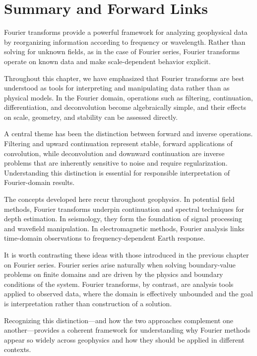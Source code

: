 \section{Summary and Forward Links}

Fourier transforms provide a powerful framework for analyzing geophysical data by reorganizing information according to frequency or wavelength. Rather than solving for unknown fields, as in the case of Fourier series, Fourier transforms operate on known data and make scale-dependent behavior explicit.

Throughout this chapter, we have emphasized that Fourier transforms are best understood as tools for interpreting and manipulating data rather than as physical models. In the Fourier domain, operations such as filtering, continuation, differentiation, and deconvolution become algebraically simple, and their effects on scale, geometry, and stability can be assessed directly.

A central theme has been the distinction between forward and inverse operations. Filtering and upward continuation represent stable, forward applications of convolution, while deconvolution and downward continuation are inverse problems that are inherently sensitive to noise and require regularization. Understanding this distinction is essential for responsible interpretation of Fourier-domain results.

The concepts developed here recur throughout geophysics. In potential field methods, Fourier transforms underpin continuation and spectral techniques for depth estimation. In seismology, they form the foundation of signal processing and wavefield manipulation. In electromagnetic methods, Fourier analysis links time-domain observations to frequency-dependent Earth response.

It is worth contrasting these ideas with those introduced in the previous chapter on Fourier series. Fourier series arise naturally when solving boundary-value problems on finite domains and are driven by the physics and boundary conditions of the system. Fourier transforms, by contrast, are analysis tools applied to observed data, where the domain is effectively unbounded and the goal is interpretation rather than construction of a solution.

Recognizing this distinction—and how the two approaches complement one another—provides a coherent framework for understanding why Fourier methods appear so widely across geophysics and how they should be applied in different contexts.